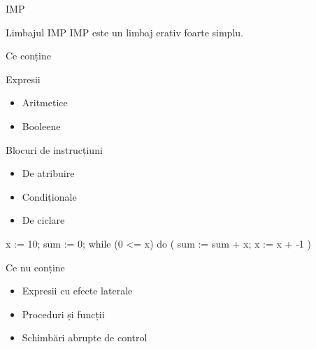 \documentclass[xcolor=pdftex,romanian,colorlinks]{beamer}
\begin{document}
\begin{subsection}{IMP}
\begin{frame}[fragile]{Limbajul IMP}
IMP este un limbaj erativ foarte simplu.
\begin{block}{Ce conține}
\begin{minipage}{.49\columnwidth}
\begin{itemize}
\vitem Expresii
\begin{itemize}
  \item Aritmetice%
  \item Booleene%
\end{itemize}
\vitem Blocuri de instrucțiuni
\begin{itemize}
  \item De atribuire%
  \item Condiționale%
  \item De ciclare  %
\end{itemize}
\end{itemize}
\end{minipage}
\begin{minipage}{.49\columnwidth}
\begin{asciic}
x := 10;
sum := 0;
while (0 <= x) do (
  sum := sum + x;
  x := x + -1
)
\end{asciic}
\end{minipage}
\end{block}
\begin{block}{Ce nu conține}
\begin{itemize}
\item Expresii cu efecte laterale
\item Proceduri și funcții
\item Schimbări abrupte de control
\end{itemize}
\end{block}
\end{frame}

\begin{comment}
 \begin{frame}{Sintaxă formală}{Backus Naur Form}
  \begin{itemize}
   \item Pentru gramatici (generative) independente de context
   \item Producții
       --- generează termeni prin expandare (rescriere)


\end{comment}
\end{subsection}
\end{document}
